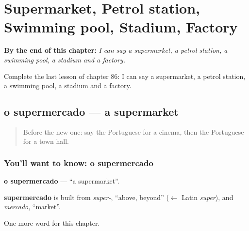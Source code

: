 
\chapter{Supermarket, Petrol station, Swimming pool, Stadium, Factory}
\label{ch:pt-supermarket-petrol-station-swimming-pool-stadium-factory}

\begin{chapteropening}
\textbf{By the end of this chapter:} \emph{I can say a supermarket, a petrol station, a swimming pool, a stadium and a factory.}

Complete the last lesson of chapter 86: I can say a supermarket, a petrol station, a swimming pool, a stadium and a factory.
\end{chapteropening}

\section[o supermercado]{o supermercado — a supermarket}

\label{lesson:PT-C86-supermercado}



\begin{quote}
Before the new one: say the Portuguese for a cinema, then the Portuguese for a town hall.
\end{quote}

\subsection*{You'll want to know: o supermercado}
\textbf{o supermercado} — \textquotedblleft{}a supermarket\textquotedblright{}.

\begin{cousinweb}
\textbf{supermercado} is built from \emph{super-}, \textquotedblleft{}above, beyond\textquotedblright{} ($\leftarrow$ Latin \emph{super}), and \emph{mercado}, \textquotedblleft{}market\textquotedblright{}.
\end{cousinweb}

\begin{grammarlens}[title={What you've built}]
One more word for this chapter.
\end{grammarlens}

